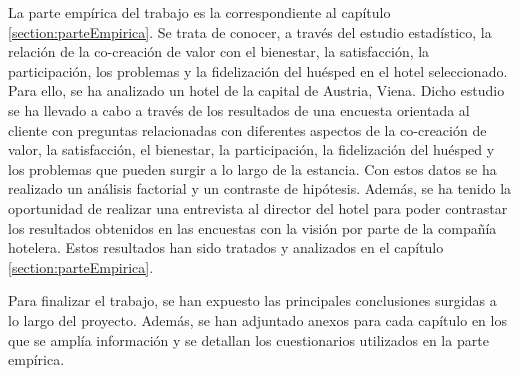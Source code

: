 La parte empírica del trabajo es la correspondiente al capítulo \ref{section:parteEmpirica}. Se trata de conocer, a través del estudio estadístico, la relación de la co-creación de valor con el bienestar, la satisfacción, la participación, los problemas y la fidelización del huésped en el hotel seleccionado. Para ello, se ha analizado un hotel de la capital de Austria, Viena. Dicho estudio se ha llevado a cabo a través de los resultados de una encuesta orientada al cliente con preguntas relacionadas con diferentes aspectos de la co-creación de valor, la satisfacción, el bienestar, la participación, la fidelización del huésped y los problemas que pueden surgir a lo largo de la estancia. Con estos datos se ha realizado un análisis factorial y un contraste de hipótesis. Además, se ha tenido la oportunidad de realizar una entrevista al director del hotel para poder contrastar los resultados obtenidos en las encuestas con la visión por parte de la compañía hotelera. Estos resultados han sido tratados y analizados en el capítulo \ref{section:parteEmpirica}.

Para finalizar el trabajo, se han expuesto las principales conclusiones surgidas a lo largo del proyecto. Además, se han adjuntado anexos para cada capítulo en los que se amplía información y se detallan los cuestionarios utilizados en la parte empírica.
